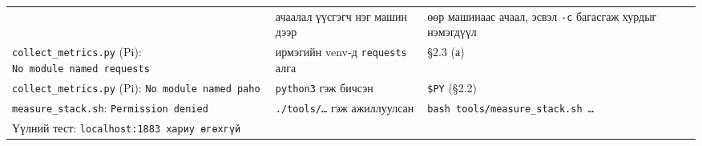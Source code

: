 \begin{longtable}[]{@{}lll@{}}
\begin{minipage}[t]{0.30\columnwidth}
\end{minipage} & \begin{minipage}[t]{0.30\columnwidth}\raggedright
ачаалал үүсгэгч нэг машин дээр\strut
\end{minipage} & \begin{minipage}[t]{0.30\columnwidth}\raggedright
өөр машинаас ачаал, эсвэл \texttt{-c} багасгаж хурдыг нэмэгдүүл\strut
\end{minipage}\tabularnewline
\begin{minipage}[t]{0.30\columnwidth}\raggedright
\texttt{collect\_\allowbreak{}metrics.\allowbreak{}py} (Pi): \texttt{No\ module\ named\ \textquotesingle{}requests\textquotesingle{}}\strut
\end{minipage} & \begin{minipage}[t]{0.30\columnwidth}\raggedright
ирмэгийн venv-д \texttt{requests} алга\strut
\end{minipage} & \begin{minipage}[t]{0.30\columnwidth}\raggedright
§2.3 (а)\strut
\end{minipage}\tabularnewline
\begin{minipage}[t]{0.30\columnwidth}\raggedright
\texttt{collect\_\allowbreak{}metrics.\allowbreak{}py} (Pi): \texttt{No\ module\ named\ \textquotesingle{}paho\textquotesingle{}}\strut
\end{minipage} & \begin{minipage}[t]{0.30\columnwidth}\raggedright
\texttt{python3} гэж бичсэн\strut
\end{minipage} & \begin{minipage}[t]{0.30\columnwidth}\raggedright
\texttt{\$PY} (§2.2)\strut
\end{minipage}\tabularnewline
\begin{minipage}[t]{0.30\columnwidth}\raggedright
\texttt{measure\_\allowbreak{}stack.\allowbreak{}sh}: \texttt{Permission\ denied}\strut
\end{minipage} & \begin{minipage}[t]{0.30\columnwidth}\raggedright
\texttt{./tools/\ldots{}} гэж ажиллуулсан\strut
\end{minipage} & \begin{minipage}[t]{0.30\columnwidth}\raggedright
\texttt{bash\ tools/\allowbreak{}measure\_\allowbreak{}stack.\allowbreak{}sh\ \ldots{}}\strut
\end{minipage}\tabularnewline
\begin{minipage}[t]{0.30\columnwidth}\raggedright
Үүлний тест: \texttt{localhost:\allowbreak{}1883\ хариу\ өгөхгүй}\strut

\end{minipage}
\end{longtable}
